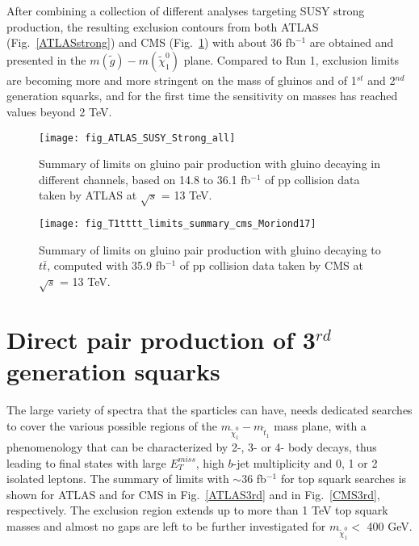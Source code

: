 \documentclass{ws-ijmpcs}
\begin{document}
After combining a collection of different analyses targeting SUSY strong production, the resulting exclusion contours from both ATLAS (Fig.~\ref{ATLASstrong}) and CMS (Fig.~\ref{CMSstrong}) with about 36 fb$^{-1}$ are obtained and presented in the $m(\tilde{g})-m(\tilde{\chi}^0_1)$ plane. Compared to Run 1, exclusion limits are becoming more and more stringent on the mass of gluinos and of 1$^{st}$ and 2$^{nd}$ generation squarks, and for the first time the sensitivity on masses has reached values beyond 2 TeV.

\begin{figure}[!tbp]
  \centering
  \begin{minipage}[b]{0.45\textwidth}
    \texttt{[image: fig\_ATLAS\_SUSY\_Strong\_all]}
	\caption{Summary of limits on gluino pair production with gluino decaying in different channels, based on 14.8 to 36.1 fb$^{-1}$ of pp collision data taken by ATLAS at $\sqrt{s}$ = 13 TeV. \label{ATLASstrong}}
  \end{minipage}
  \vspace{-1mm}
  \hfill
  \begin{minipage}[b]{0.47\textwidth}
    \texttt{[image: fig\_T1tttt\_limits\_summary\_cms\_Moriond17]}
    \vspace{0.85mm}
    \caption{Summary of limits on gluino pair production with gluino decaying to $t\bar{t}$, computed with 35.9 fb$^{-1}$ of pp collision data taken by CMS at $\sqrt{s}$ = 13 TeV. \label{CMSstrong}}
  \end{minipage}
\end{figure}


\section{Direct pair production of 3$^{rd}$ generation squarks}

The large variety of spectra that the sparticles can have, needs dedicated searches to cover the various possible regions of the $m_{\tilde{\chi}^0_1} - m_{\tilde{t}_1}$ mass plane, with a phenomenology that can be characterized by 2-, 3- or 4- body decays, thus leading to final states with large $E_T^{miss}$, high $b$-jet multiplicity and 0, 1 or 2 isolated leptons.
The summary of limits with $\sim 36$ fb$^{-1}$ for top squark searches is shown for ATLAS and for CMS in Fig.~\ref{ATLAS3rd} and in Fig.~\ref{CMS3rd}, respectively. The exclusion region extends up to more than 1 TeV top squark masses and almost no gaps are left to be further investigated for $m_{\tilde{\chi}^0_1}<$ 400 GeV.
\end{document}
